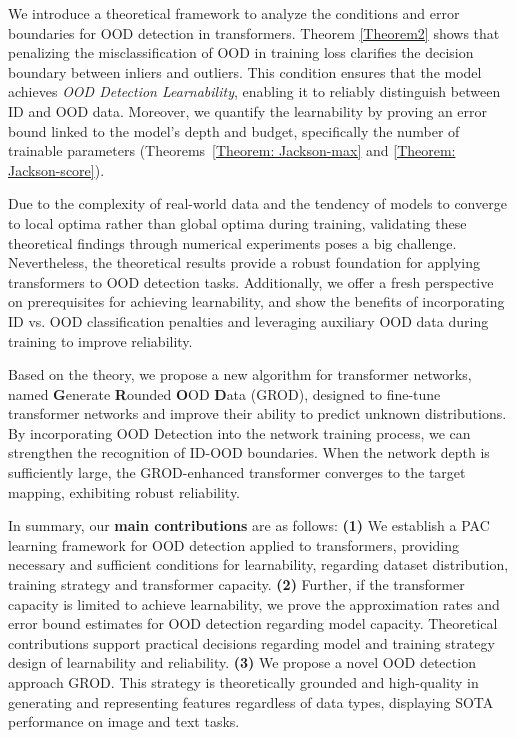 \documentclass{article}
\theoremstyle{plain}
\theoremstyle{definition}
\theoremstyle{remark}
\begin{document}
We introduce a theoretical framework to analyze the conditions and error boundaries for OOD detection in transformers. Theorem \ref{Theorem2} shows that penalizing the misclassification of OOD in training loss clarifies the decision boundary between inliers and outliers. This condition ensures that the model achieves \emph{OOD Detection Learnability}, enabling it to reliably distinguish between ID and OOD data. 
%
Moreover, we quantify the learnability by proving an error bound linked to the model's depth and budget, specifically the number of trainable parameters (Theorems~\ref{Theorem: Jackson-max} and \ref{Theorem: Jackson-score}). 

Due to the complexity of real-world data and the tendency of models to converge to local optima rather than global optima during training, validating these theoretical findings through numerical experiments poses a big challenge. Nevertheless, the theoretical results provide a robust foundation for applying transformers to OOD detection tasks. Additionally, we offer a fresh perspective on prerequisites for achieving learnability, and show
the benefits of incorporating ID vs. OOD classification penalties and leveraging auxiliary OOD data during training to improve reliability.

Based on the theory, we propose a new algorithm for transformer networks, named \textbf{G}enerate \textbf{R}ounded \textbf{O}OD \textbf{D}ata (\textsc{GROD}), designed to fine-tune transformer networks and improve their ability to predict unknown distributions.
%
By incorporating OOD Detection into the network training process, we can strengthen the recognition of ID-OOD boundaries.
%
When the network depth is sufficiently large, the GROD-enhanced transformer converges to the target mapping, exhibiting robust reliability.

In summary, our \textbf{main contributions} are as follows: 
\textbf{(1)} We establish a PAC learning framework for OOD detection applied to transformers, providing necessary and sufficient conditions for learnability, regarding dataset distribution, training strategy and transformer capacity. \textbf{(2)} Further, if the transformer capacity is limited to achieve learnability, we prove the approximation rates and error bound estimates for OOD detection regarding model capacity. Theoretical contributions support practical decisions regarding model and training strategy design of learnability and reliability. \textbf{(3)} We propose a novel OOD detection approach \textsc{GROD}. This strategy is theoretically grounded and high-quality in generating and representing features regardless of data types, displaying SOTA performance on image and text tasks. 
\end{document}
